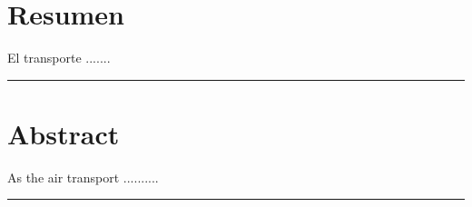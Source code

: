 

\chapter{Resumen}
\minitoc


El transporte .......

\noindent\rule[2pt]{\textwidth}{0.5pt}




\chapter{Abstract}
\minitoc

As the air transport ..........

\normalsize
\renewcommand{\baselinestretch}{1.5}

\noindent\rule[2pt]{\textwidth}{0.5pt}
